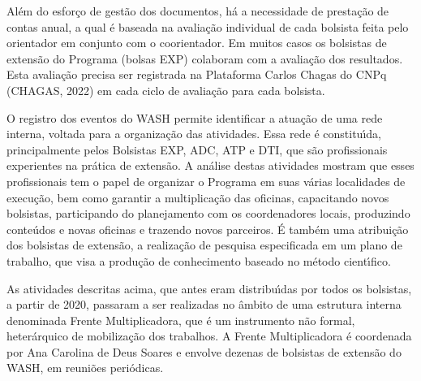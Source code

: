 \documentclass[
12pt,		%
openright,	%
twoside,  %
a4paper,			%
chapter=TITLE,		%
english,			%
french,				%
spanish,			%
brazil				%
]{USPSC-classe/USPSC}
\begin{document}
Al\'em do esfor\c{c}o de gest\~ao dos documentos, h\'a a necessidade de presta\c{c}\~ao de contas anual, a qual \'e baseada na avalia\c{c}\~ao individual de cada bolsista feita pelo orientador em conjunto com o coorientador. Em muitos casos os bolsistas de extens\~ao do Programa (bolsas EXP) colaboram com a avalia\c{c}\~ao dos resultados. Esta avalia\c{c}\~ao precisa ser registrada na Plataforma Carlos Chagas do CNPq  (CHAGAS, 2022) em cada ciclo de avalia\c{c}\~ao para cada bolsista.

















O registro dos eventos do WASH permite identificar a atua\c{c}\~ao de uma rede interna, voltada para a organiza\c{c}\~ao das atividades. Essa rede \'e constitu\'{\i}da, principalmente pelos  Bolsistas EXP, ADC, ATP e DTI, que s\~ao profissionais experientes na pr\'atica de extens\~ao. A an\'alise destas atividades mostram que esses profissionais tem o papel de organizar o Programa em suas v\'arias localidades de execu\c{c}\~ao, bem como garantir a multiplica\c{c}\~ao das oficinas, capacitando novos bolsistas, participando do planejamento com os coordenadores locais, produzindo conte\'udos e novas oficinas e trazendo novos parceiros. \'E tamb\'em uma atribui\c{c}\~ao dos bolsistas de extens\~ao, a realiza\c{c}\~ao de pesquisa especificada em um plano de trabalho, que visa a produ\c{c}\~ao de conhecimento baseado no m\'etodo cient\'{\i}fico.

















As atividades descritas acima, que antes eram distribu\'{\i}das por todos os bolsistas, a partir de 2020, passaram a ser realizadas no \^ambito de uma estrutura interna denominada \textquotedbl Frente Multiplicadora\textquotedbl , que \'e um instrumento n\~ao formal, heter\'arquico de mobiliza\c{c}\~ao dos trabalhos. A Frente Multiplicadora \'e coordenada por Ana Carolina de Deus Soares e envolve dezenas de bolsistas de extens\~ao do WASH, em reuni\~oes peri\'odicas.
\end{document}
